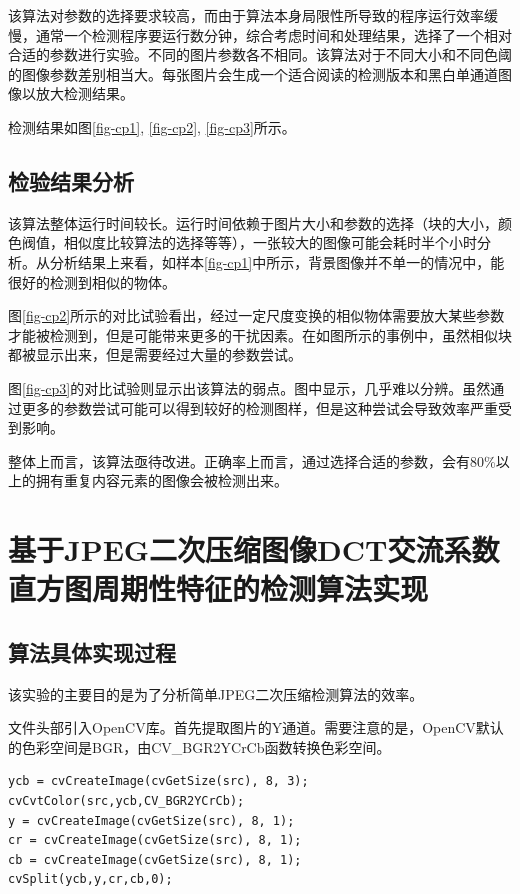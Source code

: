 \documentclass[a4paper, 10pt, notitlepage]{report}
\begin{document}
            该算法对参数的选择要求较高，而由于算法本身局限性所导致的程序运行效率缓慢，通常一个检测程序要运行数分钟，综合考虑时间和处理结果，选择了一个相对合适的参数进行实验。不同的图片参数各不相同。该算法对于不同大小和不同色阈的图像参数差别相当大。每张图片会生成一个适合阅读的检测版本和黑白单通道图像以放大检测结果。

            检测结果如图\ref{fig-cp1}, \ref{fig-cp2}, \ref{fig-cp3}所示。

		\subsection{检验结果分析}
        该算法整体运行时间较长。运行时间依赖于图片大小和参数的选择（块的大小，颜色阀值，相似度比较算法的选择等等），一张较大的图像可能会耗时半个小时分析。从分析结果上来看，如样本\ref{fig-cp1}中所示，背景图像并不单一的情况中，能很好的检测到相似的物体。

        图\ref{fig-cp2}所示的对比试验看出，经过一定尺度变换的相似物体需要放大某些参数才能被检测到，但是可能带来更多的干扰因素。在如图所示的事例中，虽然相似块都被显示出来，但是需要经过大量的参数尝试。

        图\ref{fig-cp3}的对比试验则显示出该算法的弱点。图中显示，几乎难以分辨。虽然通过更多的参数尝试可能可以得到较好的检测图样，但是这种尝试会导致效率严重受到影响。

        整体上而言，该算法亟待改进。正确率上而言，通过选择合适的参数，会有80\%以上的拥有重复内容元素的图像会被检测出来。
		

	\section{基于JPEG二次压缩图像DCT交流系数直方图周期性特征的检测算法实现}
		\subsection{算法具体实现过程}
			该实验的主要目的是为了分析简单JPEG二次压缩检测算法的效率。
			
文件头部引入OpenCV库。首先提取图片的Y通道。需要注意的是，OpenCV默认的色彩空间是BGR，由CV\_BGR2YCrCb函数转换色彩空间。
\begin{lstlisting}[language={[ANSI]C}]
ycb = cvCreateImage(cvGetSize(src), 8, 3);
cvCvtColor(src,ycb,CV_BGR2YCrCb);
y = cvCreateImage(cvGetSize(src), 8, 1);
cr = cvCreateImage(cvGetSize(src), 8, 1);
cb = cvCreateImage(cvGetSize(src), 8, 1);
cvSplit(ycb,y,cr,cb,0);
\end{lstlisting}
\end{document}

